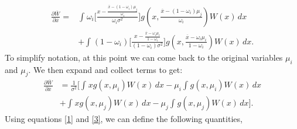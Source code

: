 \documentclass{revtex4}
\begin{document}
\begin{align}\label{16}
\frac{\partial \overline{W}}{\partial \overline{x}}=&\int_{} \omega_i\Bigg[\frac{x-\frac{\overline{x}-(1-\omega_i)\mu_{j}}{\omega_i}}{\omega_i \sigma^{2}}\Bigg] g(x,\frac{\overline{x}-(1-\omega_i)\mu_{j}}{\omega_i})W(x)\,dx \\ \nonumber 
&+ \int_{} (1-\omega_i)\Bigg[\frac{x-\frac{\overline{x}-\omega_i\mu_{i}}{1-\omega_i}}{(1-\omega_i) \sigma^{2}}\Bigg] g(x,\frac{\overline{x}-\omega_i\mu_{i}}{1-\omega_i})W(x)\,dx.
\end{align}
To simplify notation, at this point we can come back to the original variables $\mu_{i}$ and $\mu_{j}$. We then expand and collect terms to get:
\begin{align}\label{17}
\frac{\partial \overline{W}}{\partial \overline{x}}&=\frac{1}{\sigma^{2}}\Bigg[\int_{}xg(x,\mu_{i})W(x)\,dx - \mu_{i}\int_{}g(x,\mu_{i})W(x)\,dx \\ \nonumber 
&+ \int_{}xg(x,\mu_{j})W(x)\,dx - \mu_{j}\int_{}g(x,\mu_{j})W(x)\,dx\Bigg].
\end{align}
Using equations \ref{1} and \ref{3}, we can define the following quantities,
\end{document}
